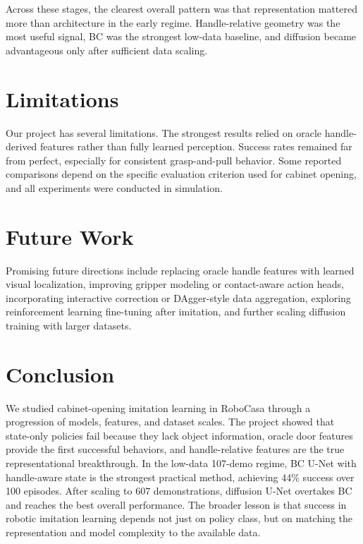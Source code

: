 \documentclass[10pt,conference]{IEEEtran}
\begin{document}
Across these stages, the clearest overall pattern was that representation mattered more than architecture in the early regime. Handle-relative geometry was the most useful signal, BC was the strongest low-data baseline, and diffusion became advantageous only after sufficient data scaling.

\section{Limitations}
Our project has several limitations. The strongest results relied on oracle handle-derived features rather than fully learned perception. Success rates remained far from perfect, especially for consistent grasp-and-pull behavior. Some reported comparisons depend on the specific evaluation criterion used for cabinet opening, and all experiments were conducted in simulation.

\section{Future Work}
Promising future directions include replacing oracle handle features with learned visual localization, improving gripper modeling or contact-aware action heads, incorporating interactive correction or DAgger-style data aggregation, exploring reinforcement learning fine-tuning after imitation, and further scaling diffusion training with larger datasets.

\section{Conclusion}
We studied cabinet-opening imitation learning in RoboCasa through a progression of models, features, and dataset scales. The project showed that state-only policies fail because they lack object information, oracle door features provide the first successful behaviors, and handle-relative features are the true representational breakthrough. In the low-data 107-demo regime, BC U-Net with handle-aware state is the strongest practical method, achieving 44\% success over 100 episodes. After scaling to 607 demonstrations, diffusion U-Net overtakes BC and reaches the best overall performance. The broader lesson is that success in robotic imitation learning depends not just on policy class, but on matching the representation and model complexity to the available data.
\end{document}
